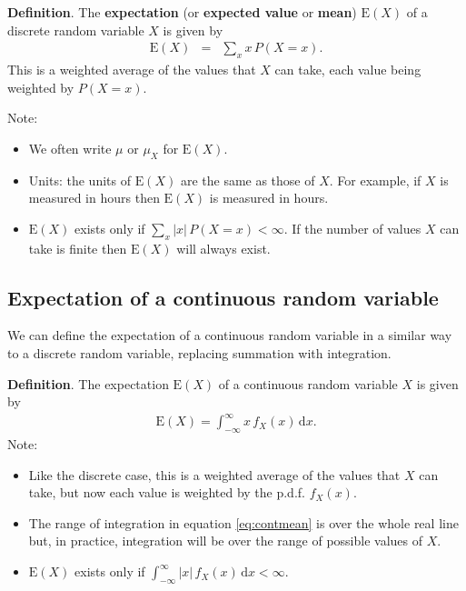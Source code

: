 \documentclass[
  british,
  11pt,
  openany, a4paper]{book}
\providecommand{\tightlist}{%
  \setlength{\itemsep}{0pt}\setlength{\parskip}{0pt}}
\begin{document}
\textbf{Definition}. The \textbf{expectation} (or \textbf{expected value} or \textbf{mean}) \(\mathrm{E}(X)\) of a discrete random variable \(X\) is given by
\begin{eqnarray}
\mathrm{E}(X) &=& \sum_x x\,P(X=x). 
\label{eq:discmean}
\end{eqnarray}
This is a weighted average of the values that \(X\) can take, each value being weighted by \(P(X=x)\).

Note:

\begin{itemize}
\tightlist
\item
  We often write \(\mu\) or \(\mu_X\) for \(\mathrm{E}(X)\).
\item
  Units: the units of \(\mathrm{E}(X)\) are the same as those of \(X\). For example, if \(X\) is measured in hours then \(\mathrm{E}(X)\) is measured in hours.
\item
  \(\mathrm{E}(X)\) exists only if \(\sum_x |x|\,P(X=x) < \infty\). If the number of values \(X\) can take is finite then \(\mathrm{E}(X)\) will always exist.
\end{itemize}

\subsection{Expectation of a continuous random variable}\label{expectation-of-a-continuous-random-variable}

We can define the expectation of a continuous random variable in a similar way to a discrete random variable, replacing summation with integration.

\textbf{Definition}.
The expectation \(\mathrm{E}(X)\) of a continuous random variable \(X\) is given by
\begin{eqnarray}
\mathrm{E}(X) = \int_{-\infty}^{\infty} x\,f_X(x) \,\mathrm{d}x. 
\label{eq:contmean}
\end{eqnarray}
Note:

\begin{itemize}
\tightlist
\item
  Like the discrete case, this is a weighted average of the values that \(X\) can take, but now each value is weighted by the
  p.d.f. \(f_X(x)\).
\item
  The range of integration in equation \eqref{eq:contmean} is over the whole real line but, in practice, integration will be over the range of possible values of \(X\).
\item
  \(\mathrm{E}(X)\) exists only if \(\int_{-\infty}^{\infty} |x|\,f_X(x) \,\mathrm{d}x < \infty\).
\end{itemize}
\end{document}
